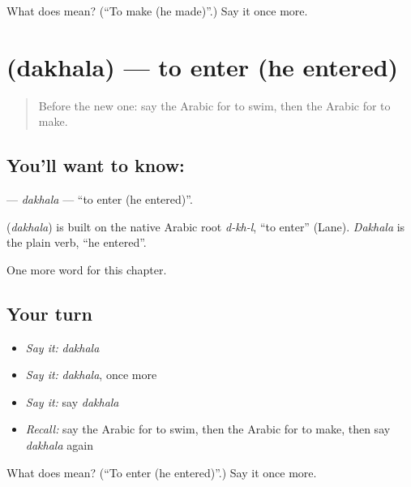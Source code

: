 \begin{tcolorbox}[breakable,colback=teal!4,colframe=teal!35!black,title={Before you move on}]
What does  mean? (\textquotedblleft{}To make (he made)\textquotedblright{}.) Say it once more.
\end{tcolorbox}
\section[\texorpdfstring{\ar{دخل} (dakhala)}{دخل (dakhala)}]{ (dakhala) — to enter (he entered)}

\label{lesson:AR-C63-dakhala}



\begin{quote}
Before the new one: say the Arabic for to swim, then the Arabic for to make.
\end{quote}

\subsection*{You'll want to know: }
\textbf{} — \emph{dakhala} — \textquotedblleft{}to enter (he entered)\textquotedblright{}.

\begin{cousinweb}
\textbf{} (\emph{dakhala}) is built on the native Arabic root \emph{d-kh-l}, \textquotedblleft{}to enter\textquotedblright{} (Lane). \emph{Dakhala} is the plain verb, \textquotedblleft{}he entered\textquotedblright{}.
\end{cousinweb}

\begin{grammarlens}[title={What you've built}]
One more word for this chapter.
\end{grammarlens}

\subsection*{Your turn}
\begin{itemize}
\raggedright
  \item \emph{Say it:} \emph{dakhala}
  \item \emph{Say it:} \emph{dakhala}, once more
  \item \emph{Say it:} say \emph{dakhala}
  \item \emph{Recall:} say the Arabic for to swim, then the Arabic for to make, then say \emph{dakhala} again
\end{itemize}

\begin{tcolorbox}[breakable,colback=teal!4,colframe=teal!35!black,title={Before you move on}]
What does  mean? (\textquotedblleft{}To enter (he entered)\textquotedblright{}.) Say it once more.
\end{tcolorbox}
